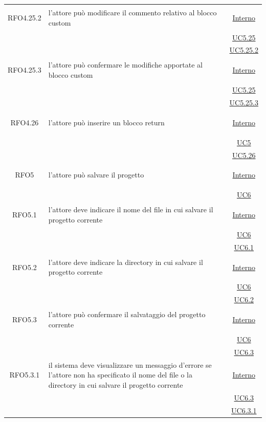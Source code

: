\begin{itemize}
\begin{itemize}
\begin{itemize}
\begin{itemize}
\begin{longtable}{|c|>{\centering}m{7cm}|c|}
\hypertarget{RFO4.25.2}{RFO4.25.2} & l'attore può modificare il commento relativo al blocco custom &  \hyperlink{Interno}{Interno}\\
& &\hyperref[UC5.25]{UC5.25}\\
& &\hyperref[UC5.25.2]{UC5.25.2}\\ \hline

\hypertarget{RFO4.25.3}{RFO4.25.3} & l'attore può confermare le modifiche apportate al blocco custom &  \hyperlink{Interno}{Interno}\\
& &\hyperref[UC5.25]{UC5.25}\\
& &\hyperref[UC5.25.3]{UC5.25.3}\\ \hline

\hypertarget{RFO4.26}{RFO4.26} & l'attore può inserire un blocco return &  \hyperlink{Interno}{Interno}\\
& &\hyperref[UC5]{UC5}\\
& &\hyperref[UC5.26]{UC5.26}\\ \hline

\hypertarget{RFO5}{RFO5} & l'attore può salvare il progetto &  \hyperlink{Interno}{Interno}\\
& & \hyperref[UC6]{UC6}\\ \hline

\hypertarget{RFO5.1}{RFO5.1} & l'attore deve indicare il nome del file in cui salvare il progetto corrente&  \hyperlink{Interno}{Interno}\\
& & \hyperref[UC6]{UC6}\\
& & \hyperref[UC6.1]{UC6.1}\\ \hline

\hypertarget{RFO5.2}{RFO5.2} & l'attore deve indicare la directory in cui salvare il progetto corrente&  \hyperlink{Interno}{Interno}\\
& & \hyperref[UC6]{UC6}\\
& & \hyperref[UC6.2]{UC6.2}\\ \hline

\hypertarget{RFO5.3}{RFO5.3} & l'attore può confermare il salvataggio del progetto corrente &  \hyperlink{Interno}{Interno}\\
& & \hyperref[UC6]{UC6}\\
& & \hyperref[UC6.3]{UC6.3}\\ \hline

\hypertarget{RFO5.3.1}{RFO5.3.1} & il sistema deve visualizzare un messaggio d'errore se l'attore non ha specificato il nome del file o la directory in cui salvare il progetto corrente &  \hyperlink{Interno}{Interno}\\
& & \hyperref[UC6.3]{UC6.3}\\
& & \hyperref[UC6.3.1]{UC6.3.1}\\ \hline


\end{longtable}
\end{itemize}
\end{itemize}
\end{itemize}
\end{itemize}
